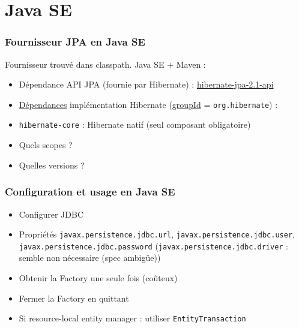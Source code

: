 \documentclass[french, english]{beamer}
\begin{document}
\section{Java SE}
\begin{frame}
	\frametitle{Fournisseur JPA en Java SE}
	Fournisseur trouvé dans classpath. Java SE + Maven :
	\begin{itemize}
		\item Dépendance API JPA (fournie par Hibernate) : \href{http://search.maven.org/\#search\%7Cgav\%7C1\%7Cg\%3A\%22org.hibernate.javax.persistence\%22\%20AND\%20a\%3A\%22hibernate-jpa-2.1-api\%22}{hibernate-jpa-2.1-api}
		\item \href{https://docs.jboss.org/hibernate/orm/5.2/quickstart/html_single/\#_the_hibernate_modules_artifacts}{Dépendances} implémentation Hibernate {\tiny (\href{https://docs.jboss.org/hibernate/orm/5.2/quickstart/html_single/\#_maven_repository_artifacts}{groupId} = \texttt{org.hibernate})} :
		\item \texttt{hibernate-core} : Hibernate natif (seul composant obligatoire)
    		\item Quels scopes ?
		\item Quelles versions ?
	\end{itemize}
\end{frame}

\begin{frame}
	\frametitle{Configuration et usage en Java SE}
	\begin{itemize}
		\item Configurer JDBC
		\item Propriétés \texttt{javax.persistence.jdbc.url}, \texttt{javax.persistence.jdbc.user}, \texttt{javax.persistence.jdbc.password} {\tiny (\texttt{javax.persistence.jdbc.driver} : semble non nécessaire (spec ambigüe))}
		\item Obtenir la Factory une seule fois (coûteux)
		\item Fermer la Factory en quittant
		\item Si resource-local entity manager : utiliser \texttt{EntityTransaction}
	\end{itemize}
\end{frame}
\end{document}

